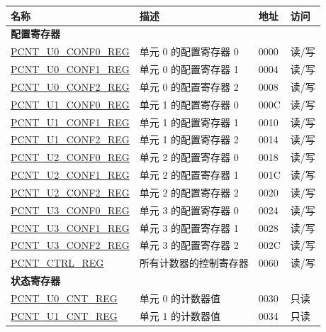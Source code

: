 \begin{longtable}{ | p{6cm} | p{7.2cm} | p{1.3cm} | p{1cm} | }
\hline\rowcolor{lightgray}
名称 & 描述 &  地址 & 访问 \\ \hline
\endhead
\multicolumn{4}{|l|}{\textbf{配置寄存器}} \\ \hline
\hyperref[regdesc:PCNTUNCONF0REG]{PCNT\_U0\_CONF0\_REG} & 单元 0 的配置寄存器 0 & \hexprefix{}0000 & 读/写 \\ \hline
\hyperref[regdesc:PCNTUNCONF1REG]{PCNT\_U0\_CONF1\_REG} & 单元 0 的配置寄存器 1 & \hexprefix{}0004 & 读/写 \\ \hline
\hyperref[regdesc:PCNTUNCONF2REG]{PCNT\_U0\_CONF2\_REG} & 单元 0 的配置寄存器 2 & \hexprefix{}0008 & 读/写 \\ \hline
\hyperref[regdesc:PCNTUNCONF0REG]{PCNT\_U1\_CONF0\_REG} & 单元 1 的配置寄存器 0 & \hexprefix{}000C & 读/写 \\ \hline
\hyperref[regdesc:PCNTUNCONF1REG]{PCNT\_U1\_CONF1\_REG} & 单元 1 的配置寄存器 1 & \hexprefix{}0010 & 读/写 \\ \hline
\hyperref[regdesc:PCNTUNCONF2REG]{PCNT\_U1\_CONF2\_REG} & 单元 1 的配置寄存器 2 & \hexprefix{}0014 & 读/写 \\ \hline
\hyperref[regdesc:PCNTUNCONF0REG]{PCNT\_U2\_CONF0\_REG} & 单元 2 的配置寄存器 0 & \hexprefix{}0018 & 读/写 \\ \hline
\hyperref[regdesc:PCNTUNCONF1REG]{PCNT\_U2\_CONF1\_REG} & 单元 2 的配置寄存器 1 & \hexprefix{}001C & 读/写 \\ \hline
\hyperref[regdesc:PCNTUNCONF2REG]{PCNT\_U2\_CONF2\_REG} & 单元 2 的配置寄存器 2 & \hexprefix{}0020 & 读/写 \\ \hline
\hyperref[regdesc:PCNTUNCONF0REG]{PCNT\_U3\_CONF0\_REG} & 单元 3 的配置寄存器 0 & \hexprefix{}0024 & 读/写 \\ \hline
\hyperref[regdesc:PCNTUNCONF1REG]{PCNT\_U3\_CONF1\_REG} & 单元 3 的配置寄存器 1 & \hexprefix{}0028 & 读/写 \\ \hline
\hyperref[regdesc:PCNTUNCONF2REG]{PCNT\_U3\_CONF2\_REG} & 单元 3 的配置寄存器 2 & \hexprefix{}002C & 读/写 \\ \hline
\hyperref[regdesc:PCNTCTRLREG]{PCNT\_CTRL\_REG} & 所有计数器的控制寄存器 & \hexprefix{}0060 & 读/写 \\ \hline
\multicolumn{4}{|l|}{\textbf{状态寄存器}} \\ \hline
\hyperref[regdesc:PCNTUNCNTREG]{PCNT\_U0\_CNT\_REG} & 单元 0 的计数器值 & \hexprefix{}0030 & 只读 \\ \hline
\hyperref[regdesc:PCNTUNCNTREG]{PCNT\_U1\_CNT\_REG} & 单元 1 的计数器值 & \hexprefix{}0034 & 只读 \\ \hline

\end{longtable}
